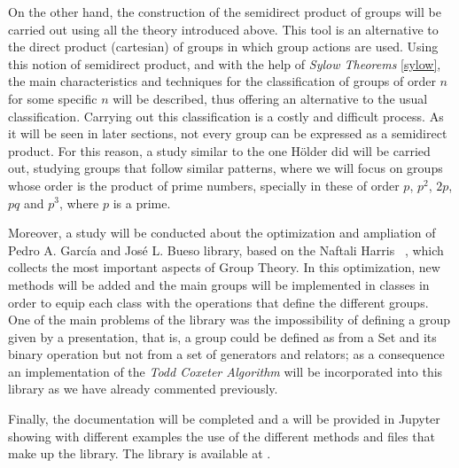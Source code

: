 \newpage

On the other hand, the construction of the semidirect product of groups will be carried out using all the theory introduced above. This tool is an alternative to the direct product (cartesian) of groups in which group actions are used. Using this notion of semidirect product, and with the help of \textit{Sylow Theorems} \ref{sylow}, the main characteristics and techniques for the classification of groups of order $n$ for some specific $n$ will be described, thus offering an alternative to the usual classification. 
Carrying out this classification is a costly and difficult process. As it will be seen in later sections, not every group can be expressed as a semidirect product. For this reason, a study similar to the one Hölder did will be carried out, studying groups that follow similar patterns, where we will focus on groups whose order is the product of prime numbers, specially in these of order $p$,  $p^2$, $2p$, $pq$ and $p^3$, where $p$ is a prime.



Moreover, a study will be conducted about the optimization and ampliation of Pedro A. García and José L. Bueso library, based on the Naftali Harris ~\cite{Absalg}, which collects the most important aspects of Group Theory. In this optimization, new methods will be added and the main groups will be implemented in classes in order to equip each class with the operations that define the different groups.
One of the main problems of the library was the impossibility of defining a group given by a presentation, that is, a group could be defined as from a Set and its binary operation but not from a set of generators and relators; as a consequence an implementation of the \textit{Todd Coxeter Algorithm} will be incorporated into this library as we have already commented previously.

Finally, the documentation will be completed and a \href{https://github.com/lmd-ugr/Grupos/blob/master/Tutorial.ipynb}{\color{brown2}{tutorial}} will be provided in Jupyter showing with different examples the use of the different methods and files that make up the library. The library is available at \href{https://github.com/lmd-ugr/Grupos}{\color{brown2}{https://github.com/lmd-ugr/Grupos}}.





\endinput